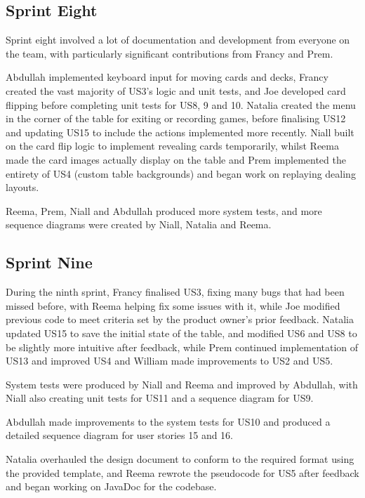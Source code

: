 \documentclass[a4paper]{project}
\begin{document}
		\subsection{Sprint Eight}\label{subsec:sprint-eight}
		
			Sprint eight involved a lot of documentation and development from everyone on the team, with particularly significant contributions from Francy and Prem.
			
			Abdullah implemented keyboard input for moving cards and decks, Francy created the vast majority of US3's logic and unit tests, and Joe developed card flipping before completing unit tests for US8, 9 and 10. Natalia created the menu in the corner of the table for exiting or recording games, before finalising US12 and updating US15 to include the actions implemented more recently. Niall built on the card flip logic to implement revealing cards temporarily, whilst Reema made the card images actually display on the table and Prem implemented the entirety of US4 (custom table backgrounds) and began work on replaying dealing layouts.
			
			Reema, Prem, Niall and Abdullah produced more system tests, and more sequence diagrams were created by Niall, Natalia and Reema.
			
		\subsection{Sprint Nine}\label{subsec:sprint-nine}
		
			During the ninth sprint, Francy finalised US3, fixing many bugs that had been missed before, with Reema helping fix some issues with it, while Joe modified previous code to meet criteria set by the product owner's prior feedback. Natalia updated US15 to save the initial state of the table, and modified US6 and US8 to be slightly more intuitive after feedback, while Prem continued implementation of US13 and improved US4 and William made improvements to US2 and US5.
			
			System tests were produced by Niall and Reema and improved by Abdullah, with Niall also creating unit tests for US11 and a sequence diagram for US9.
		
			Abdullah made improvements to the system tests for US10 and produced a detailed sequence diagram for user stories 15 and 16.
			
			Natalia overhauled the design document to conform to the required format using the provided template, and Reema rewrote the pseudocode for US5 after feedback and began working on JavaDoc for the codebase.
			
\end{document}
